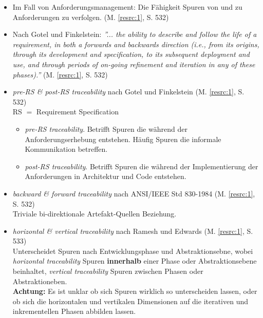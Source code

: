 \begin{itemize}


\item Im Fall von Anforderungsmanagement: Die Fähigkeit Spuren von und zu Anforderungen zu verfolgen. (M. \ref{resrc:1}, S. 532)

\item 
Nach Gotel und Finkelstein: 
\textit{''... the ability to describe and follow the life of a requirement, in both a forwards and backwards direction (i.e., from its origins, through its development and specification, to its subsequent deployment and use, and through periods of on-going refinement and iteration in any of these phases).''} (M. \ref{resrc:1}, S. 532)

\item
\textit{pre-RS \& post-RS traceability} nach Gotel und Finkelstein (M. \ref{resrc:1}, S. 532)
\\RS $=$ Requirement Specification
\begin{itemize}
\item 
\textit{pre-RS traceability}.
Betrifft Spuren die während der Anforderungserhebung entstehen. Häufig Spuren die informale Kommunikation betreffen.
\item 
\textit{post-RS traceability}.
Betrifft Spuren die während der Implementierung der Anforderungen in Architektur und Code entstehen.
\end{itemize}

\item
\textit{backward \& forward traceability} nach ANSI/IEEE Std 830-1984 (M. \ref{resrc:1}, S. 532)
\\Triviale bi-direktionale Artefakt-Quellen Beziehung.


\item
\textit{horizontal \& vertical traceability} nach Ramesh und Edwards (M. \ref{resrc:1}, S. 533)
\\Unterscheidet Spuren nach Entwicklungsphase und Abstraktionsebne, wobei \textit{horizontal traceability} Spuren \textbf{innerhalb} einer Phase oder Abstraktionsebene beinhaltet, \textit{vertical traceability} Spuren zwischen Phasen oder Abstraktioneben. 
\\\textbf{Achtung:} Es ist unklar ob sich Spuren wirklich so unterscheiden lassen, oder ob sich die horizontalen und vertikalen Dimensionen auf die iterativen und inkrementellen Phasen abbilden lassen.

\end{itemize}



